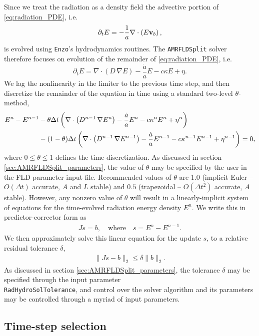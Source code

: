 \documentclass[letterpaper,10pt]{article}
\renewcommand{\(}{\left(}
\renewcommand{\)}{\right)}
\newcommand{\vb}{{\bf v}_b}
\newcommand{\dt}{\Delta t}
\begin{document}
Since we treat the radiation as a density field the advective portion
of \eqref{eq:radiation_PDE}, i.e. 
\[
  \partial_{t} E = -\frac1a \nabla\cdot\(E\vb\),
\]
is evolved using {\tt Enzo}'s hydrodynamics routines.  The 
{\tt AMRFLDSplit} solver therefore focuses on evolution of the
remainder of \eqref{eq:radiation_PDE}, i.e.
\[
  \partial_{t} E = \nabla\cdot\(D\,\nabla E\) - \frac{\dot{a}}{a} E - c\kappa E + \eta.
\]
We lag the nonlinearity in the limiter to the previous time step, and
then discretize the remainder of the equation in time using a standard
two-level $\theta$-method,
\begin{align}
  \label{eq:radiation_PDE_theta}
  E^n - E^{n-1} &- \theta\dt\left(\nabla\cdot\(D^{n-1}\,\nabla E^n\) - \frac{\dot{a}}{a} E^n -
    c\kappa^n E^n + \eta^n\right) \\ 
  \notag
  & - (1-\theta)\dt\left(\nabla\cdot\(D^{n-1}\,\nabla E^{n-1}\) - \frac{\dot{a}}{a} E^{n-1} -
    c\kappa^{n-1} E^{n-1} + \eta^{n-1}\right) = 0,
\end{align}
where $0\le\theta\le 1$ defines the time-discretization.  As discussed
in section \ref{sec:AMRFLDSplit_parameters}, the value of $\theta$ may
be specified by the user in the FLD parameter input file. Recommended
values of $\theta$ are 1.0 (implicit Euler -- $O(\Delta t)$ accurate,
$A$ and $L$ stable) and $0.5$ (trapezoidal -- $O(\Delta t^2)$
accurate, $A$ stable).  However, any nonzero value of $\theta$ will
result in a linearly-implicit system of equations for the
time-evolved radiation energy density $E^n$.  We write this in
predictor-corrector form as
\begin{align}
\label{eq:linear_system}
  J s = b, \quad\text{where}\quad s = E^n - E^{n-1}.
\end{align}
We then approximately solve this linear equation for the update $s$,
to a relative residual tolerance $\delta$,
\begin{align}
\label{eq:linear_system_approx}
  \| J s - b \|_2 \le \delta \|b\|_2.
\end{align}
As discussed in section \ref{sec:AMRFLDSplit_parameters}, the
tolerance $\delta$ may be specified through the input parameter \\
{\tt RadHydroSolTolerance}, and control over the solver algorithm and
its parameters may be controlled through a myriad of input parameters.




\subsection{Time-step selection}
\label{sec:AMRFLDSplit_dt_selection}
\end{document}
